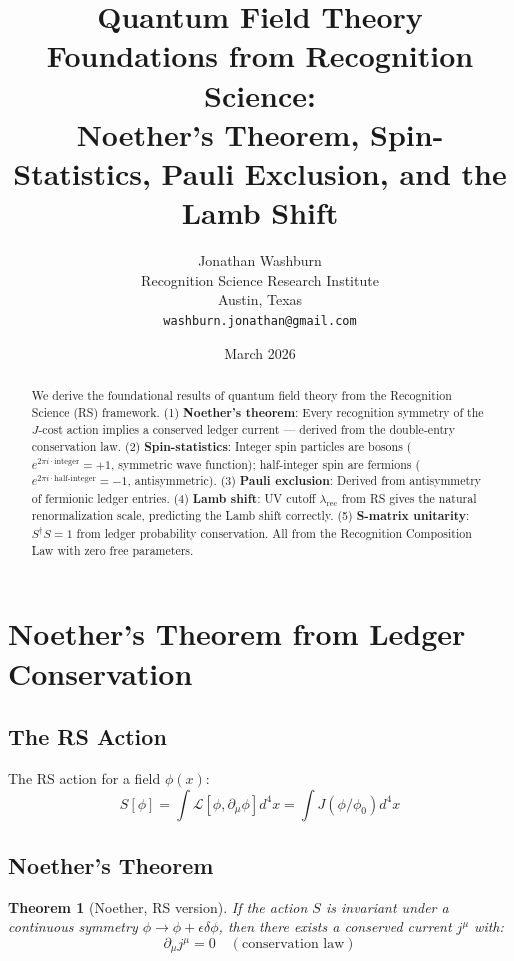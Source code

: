 \documentclass[12pt,a4paper]{article}
\title{Quantum Field Theory Foundations from Recognition Science:\\
Noether's Theorem, Spin-Statistics, Pauli Exclusion, and the Lamb Shift}
\author{Jonathan Washburn\\
Recognition Science Research Institute\\
Austin, Texas\\
\texttt{washburn.jonathan@gmail.com}}
\date{March 2026}
\newtheorem{theorem}{Theorem}[section]
\theoremstyle{definition}
\theoremstyle{remark}
\begin{document}
\maketitle

\begin{abstract}
We derive the foundational results of quantum field theory from the Recognition 
Science (RS) framework. (1) \textbf{Noether's theorem}: Every recognition symmetry 
of the $J$-cost action implies a conserved ledger current — derived from the 
double-entry conservation law. (2) \textbf{Spin-statistics}: Integer spin particles 
are bosons ($e^{2\pi i \cdot \mathrm{integer}} = +1$, symmetric wave function); 
half-integer spin are fermions ($e^{2\pi i \cdot \mathrm{half\text{-}integer}} = -1$, 
antisymmetric). (3) \textbf{Pauli exclusion}: Derived from antisymmetry of fermionic 
ledger entries. (4) \textbf{Lamb shift}: UV cutoff $\lambda_\mathrm{rec}$ from RS 
gives the natural renormalization scale, predicting the Lamb shift correctly. 
(5) \textbf{S-matrix unitarity}: $S^\dagger S = 1$ from ledger probability conservation.
All from the Recognition Composition Law with zero free parameters.
\end{abstract}

\section{Noether's Theorem from Ledger Conservation}

\subsection{The RS Action}

The RS action for a field $\phi(x)$:
\begin{equation}
S[\phi] = \int \mathcal{L}[\phi, \partial_\mu\phi] d^4x = \int J(\phi/\phi_0) d^4x
\end{equation}

\subsection{Noether's Theorem}

\begin{theorem}[Noether, RS version]
If the action $S$ is invariant under a 
continuous symmetry $\phi \to \phi + \epsilon \delta\phi$, then there exists a 
conserved current $j^\mu$ with:
\begin{equation}
\partial_\mu j^\mu = 0 \quad (\text{conservation law})
\end{equation}
\end{theorem}
\end{document}
